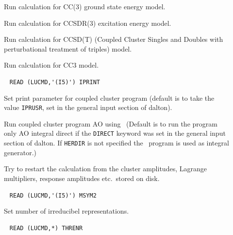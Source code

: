 \begin{description}
\item[]  
       Run calculation for CC(3) ground state energy model.

\item[] 
        Run calculation for CCSDR(3) excitation energy model.
%
%
\item[]  
        Run calculation for CCSD(T) (Coupled Cluster Singles and 
        Doubles with perturbational treatment of triples) model.
%
\item[]     
        Run calculation for CC3 model.
%
\item[]  \verb| |\newline
\verb|READ (LUCMD,'(I5)') IPRINT|

       Set print parameter for coupled cluster program
       (default is to take the value \verb+IPRUSR+, set in the general
       input section of dalton).
%
\item[] 
       Run coupled cluster program AO  using \her\
       (Default is to run the program only AO integral direct
       if the \verb+DIRECT+ keyword was set in the general
       input section of dalton. If \verb+HERDIR+ is not specified the \eri\
       program is used as integral generator.) 
%
\item[] 
       Try to restart the calculation from the cluster amplitudes,
       Lagrange multipliers, response amplitudes etc.\ stored on
       disk.
%
\item[] \verb| |\newline
       \verb|READ (LUCMD,'(I5)') MSYM2|

       Set number of irreducibel representations. 
 
\item[\Key{THRENR}] \verb| |\newline
       \verb|READ (LUCMD,*) THRENR|


\end{description}
